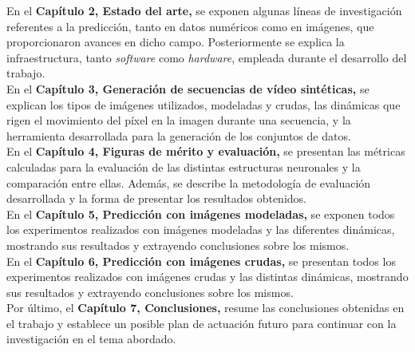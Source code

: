 En el \textbf{Capítulo 2, Estado del arte,} se exponen algunas líneas de investigación referentes a la predicción, tanto en datos numéricos como en imágenes, que proporcionaron avances en dicho campo. Posteriormente se explica la infraestructura, tanto \textit{software} como \textit{hardware}, empleada durante el desarrollo del trabajo.\\

En el \textbf{Capítulo 3, Generación de secuencias de vídeo sintéticas,} se explican los tipos de imágenes utilizados, modeladas y crudas, las dinámicas que rigen el movimiento del píxel en la imagen durante una secuencia, y la herramienta desarrollada para la generación de los conjuntos de datos.\\

En el \textbf{Capítulo 4, Figuras de mérito y evaluación,} se presentan las métricas calculadas para la evaluación de las distintas estructuras neuronales y la comparación entre ellas. Además, se describe la metodología de evaluación desarrollada y la forma de presentar los resultados obtenidos.\\

En el \textbf{Capítulo 5, Predicción con imágenes modeladas,} se exponen todos los experimentos realizados con imágenes modeladas y las diferentes dinámicas, mostrando sus resultados y extrayendo conclusiones sobre los mismos.\\

En el \textbf{Capítulo 6, Predicción con imágenes crudas,} se presentan todos los experimentos realizados con imágenes crudas y las distintas dinámicas,  mostrando sus resultados y extrayendo conclusiones sobre los mismos.\\

Por último, el \textbf{Capítulo 7, Conclusiones,} resume las conclusiones obtenidas en el trabajo y establece un posible plan de actuación futuro para continuar con la investigación en el tema abordado.

